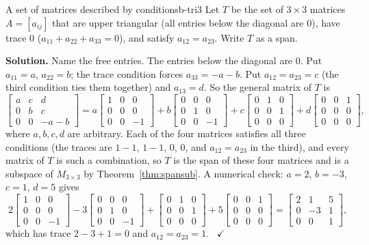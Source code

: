 \documentclass[11pt]{article}
\begin{document}
\begin{exmp}{A set of matrices described by conditions}{b-tri3}
Let $T$ be the set of $3\times3$ matrices $A=[a_{ij}]$ that are upper triangular (all entries below the diagonal are $0$), have trace $0$ ($a_{11}+a_{22}+a_{33}=0$), and satisfy $a_{12}=a_{23}$. Write $T$ as a span.

\textbf{Solution.} Name the free entries. The entries below the diagonal are $0$. Put $a_{11}=a$, $a_{22}=b$; the trace condition forces $a_{33}=-a-b$. Put $a_{12}=a_{23}=c$ (the third condition ties them together) and $a_{13}=d$. So the general matrix of $T$ is
\[
\begin{bmatrix}a&c&d\\0&b&c\\0&0&-a-b\end{bmatrix}=a\begin{bmatrix}1&0&0\\0&0&0\\0&0&-1\end{bmatrix}+b\begin{bmatrix}0&0&0\\0&1&0\\0&0&-1\end{bmatrix}+c\begin{bmatrix}0&1&0\\0&0&1\\0&0&0\end{bmatrix}+d\begin{bmatrix}0&0&1\\0&0&0\\0&0&0\end{bmatrix},
\]
where $a,b,c,d$ are arbitrary. Each of the four matrices satisfies all three conditions (the traces are $1-1$, $1-1$, $0$, $0$, and $a_{12}=a_{23}$ in the third), and every matrix of $T$ is such a combination, so $T$ is the span of these four matrices and is a subspace of $M_{3\times3}$ by Theorem~\ref{thm:spansub}. A numerical check: $a=2$, $b=-3$, $c=1$, $d=5$ gives
\[
2\begin{bmatrix}1&0&0\\0&0&0\\0&0&-1\end{bmatrix}-3\begin{bmatrix}0&0&0\\0&1&0\\0&0&-1\end{bmatrix}+\begin{bmatrix}0&1&0\\0&0&1\\0&0&0\end{bmatrix}+5\begin{bmatrix}0&0&1\\0&0&0\\0&0&0\end{bmatrix}=\begin{bmatrix}2&1&5\\0&-3&1\\0&0&1\end{bmatrix},
\]
which has trace $2-3+1=0$ and $a_{12}=a_{23}=1$. \ $\checkmark$
\end{exmp}
\end{document}
